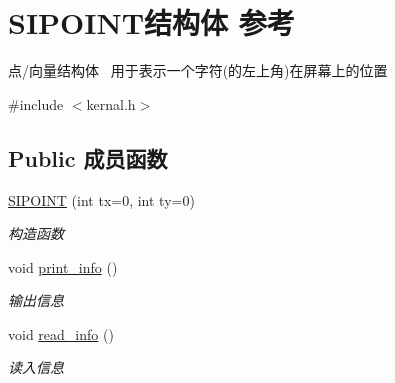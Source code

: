 \hypertarget{struct_s_i_p_o_i_n_t}{}\section{S\+I\+P\+O\+I\+N\+T结构体 参考}
\label{struct_s_i_p_o_i_n_t}


点/向量结构体~\newline
用于表示一个字符(的左上角)在屏幕上的位置  




{\ttfamily \#include $<$kernal.\+h$>$}

\subsection*{Public 成员函数}
\begin{DoxyCompactItemize}
\item 
\mbox{\label{struct_s_i_p_o_i_n_t_a1695c9d8ff55b1169de1c6a9c379687c}} 
\hyperlink{struct_s_i_p_o_i_n_t_a1695c9d8ff55b1169de1c6a9c379687c}{S\+I\+P\+O\+I\+NT} (int tx=0, int ty=0)
\begin{DoxyCompactList}\small\item\em 构造函数~\newline
\end{DoxyCompactList}\item 
\mbox{\label{struct_s_i_p_o_i_n_t_addf5c16437bb7c30f8775e5ca430b66d}} 
void \hyperlink{struct_s_i_p_o_i_n_t_addf5c16437bb7c30f8775e5ca430b66d}{print\+\_\+info} ()
\begin{DoxyCompactList}\small\item\em 输出信息 \end{DoxyCompactList}\item 
\mbox{\label{struct_s_i_p_o_i_n_t_a92506794ca743f148749ee05ca71212e}} 
void \hyperlink{struct_s_i_p_o_i_n_t_a92506794ca743f148749ee05ca71212e}{read\+\_\+info} ()
\begin{DoxyCompactList}\small\item\em 读入信息 \end{DoxyCompactList}\end{DoxyCompactItemize}
